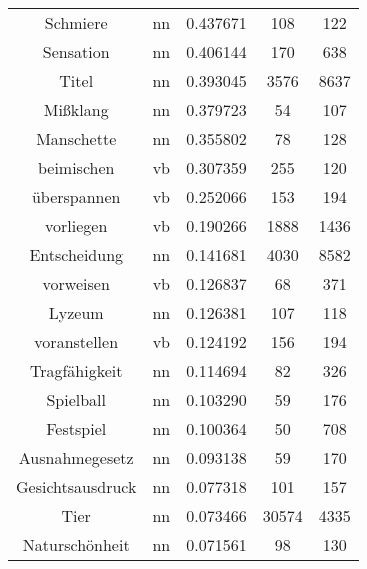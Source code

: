 \begin{table}
\begin{tabular}{ccccc}
Schmiere           & nn            & 0.437671           & 108                & 122                 \\
Sensation          & nn            & 0.406144           & 170                & 638                 \\
Titel              & nn            & 0.393045           & 3576               & 8637                \\
Mißklang           & nn            & 0.379723           & 54                 & 107                 \\
Manschette         & nn            & 0.355802           & 78                 & 128                 \\
beimischen         & vb            & 0.307359           & 255                & 120                 \\
überspannen        & vb            & 0.252066           & 153                & 194                 \\
vorliegen          & vb            & 0.190266           & 1888               & 1436                \\
Entscheidung       & nn            & 0.141681           & 4030               & 8582                \\
vorweisen          & vb            & 0.126837           & 68                 & 371                 \\
Lyzeum             & nn            & 0.126381           & 107                & 118                 \\
voranstellen       & vb            & 0.124192           & 156                & 194                 \\
Tragfähigkeit      & nn            & 0.114694           & 82                 & 326                 \\
Spielball          & nn            & 0.103290           & 59                 & 176                 \\
Festspiel          & nn            & 0.100364           & 50                 & 708                 \\
Ausnahmegesetz     & nn            & 0.093138           & 59                 & 170                 \\
Gesichtsausdruck   & nn            & 0.077318           & 101                & 157                 \\
Tier               & nn            & 0.073466           & 30574              & 4335                \\
Naturschönheit     & nn            & 0.071561           & 98                 & 130                 \\

\end{tabular}
\end{table}
